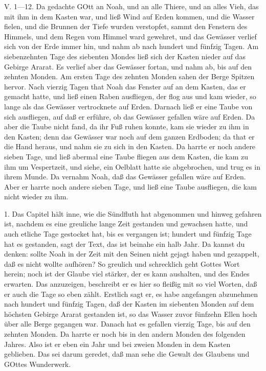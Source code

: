 \begin{schriftzitat}
V. 1—12. Da gedachte GOtt an Noah, und an alle Thiere, und an alles Vieh, das mit ihm in dem Kasten war, und ließ Wind auf Erden kommen, und die Wasser fielen, und die Brunnen der Tiefe wurden verstopfet, sammt den Fenstern des Himmels, und dem Regen vom Himmel ward gewehret, und das Gewässer verlief sich von der Erde immer hin, und nahm ab nach hundert und fünfzig Tagen. Am siebenzehnten Tage des siebenten Mondes ließ sich der Kasten nieder auf das Gebirge Ararat. Es verlief aber das Gewässer fortan, und nahm ab, bis auf den zehnten Monden. Am ersten Tage des zehnten Monden sahen der Berge Spitzen hervor. Nach vierzig Tagen that Noah das Fenster auf an dem Kasten, das er gemacht hatte, und ließ einen Raben ausfliegen, der flog aus und kam wieder, so lange als das Gewässer vertrocknete auf Erden. Darnach ließ er eine Taube von sich ausfliegen, auf daß er erführe, ob das Gewässer gefallen wäre auf Erden. Da aber die Taube nicht fand, da ihr Fuß ruhen konnte, kam sie wieder zu ihm in den Kasten; denn das Gewässer war noch auf dem ganzen Erdboden; da that er die Hand heraus, und nahm sie zu sich in den Kasten. Da harrte er noch andere sieben Tage, und ließ abermal eine Taube fliegen aus dem Kasten, die kam zu ihm um Vespertzeit, und siehe, ein Oelblatt hatte sie abgebrochen, und trug es in ihrem Munde. Da vernahm Noah, daß das Gewässer gefallen wäre auf Erden. Aber er harrte noch andere sieben Tage, und ließ eine Taube ausfliegen, die kam nicht wieder zu ihm.
\end{schriftzitat}

1. Das Capitel hält inne, wie die Sündfluth hat abgenommen und hinweg gefahren ist, nachdem es eine greuliche lange Zeit gestanden und gewachsen hatte, und auch etliche Tage gestocket hat, bis es vergangen ist; hundert und fünfzig Tage hat es gestanden, sagt der Text, das ist beinahe ein halb Jahr. Da kannst du denken: sollte Noah in der Zeit mit den Seinen nicht gejagt haben und gezappelt, daß es nicht wollte aufhören? So greulich und schrecklich geht Gottes Wort herein; noch ist der Glaube viel stärker, der es kann aushalten, und des Endes erwarten. Das anzuzeigen, beschreibt er es hier so fleißig mit so viel Worten, daß er auch die Tage so eben zählt. Erstlich sagt er, es habe angefangen abzunehmen nach hundert und fünfzig Tagen, daß der Kasten im siebenten Monden auf dem höchsten Gebirge Ararat gestanden ist, so das Wasser zuvor fünfzehn Ellen hoch über alle Berge gegangen war. Danach hat es gefallen vierzig Tage, bis auf den zehnten Monden. Da harrte er noch bis in den andern Monden des folgenden Jahres. Also ist er eben ein Jahr und bei zweien Monden in dem Kasten geblieben. Das sei darum geredet, daß man sehe die Gewalt des Glaubens und GOttes Wunderwerk.

